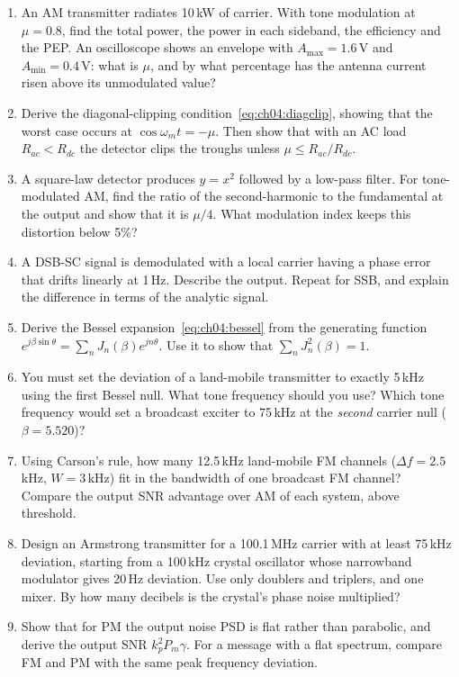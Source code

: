 \problems
\begin{enumerate}[label=\thechapter.\arabic*]
\item An AM transmitter radiates 10\,kW of carrier. With tone modulation at $\mu=0.8$, find the total power, the
power in each sideband, the efficiency and the PEP. An oscilloscope shows an envelope with $A_{\max}=1.6$\,V and
$A_{\min}=0.4$\,V: what is $\mu$, and by what percentage has the antenna current risen above its unmodulated
value?
\item Derive the diagonal-clipping condition~\eqref{eq:ch04:diagclip}, showing that the worst case occurs at
$\cos\omega_mt=-\mu$. Then show that with an AC load $R_{ac}<R_{dc}$ the detector clips the troughs unless
$\mu\le R_{ac}/R_{dc}$.
\item A square-law detector produces $y=x^2$ followed by a low-pass filter. For tone-modulated AM, find the
ratio of the second-harmonic to the fundamental at the output and show that it is $\mu/4$. What modulation index
keeps this distortion below 5\%?
\item A DSB-SC signal is demodulated with a local carrier having a phase error that drifts linearly at 1\,Hz.
Describe the output. Repeat for SSB, and explain the difference in terms of the analytic signal.
\item Derive the Bessel expansion~\eqref{eq:ch04:bessel} from the generating function
$e^{j\beta\sin\theta}=\sum_n J_n(\beta)e^{jn\theta}$. Use it to show that $\sum_nJ_n^2(\beta)=1$.
\item You must set the deviation of a land-mobile transmitter to exactly 5\,kHz using the first Bessel null.
What tone frequency should you use? Which tone frequency would set a broadcast exciter to 75\,kHz at the
\emph{second} carrier null ($\beta=5.520$)?
\item Using Carson's rule, how many 12.5\,kHz land-mobile FM channels ($\Delta f=2.5$\,kHz, $W=3$\,kHz) fit in the
bandwidth of one broadcast FM channel? Compare the output SNR advantage over AM of each system, above
threshold.
\item Design an Armstrong transmitter for a 100.1\,MHz carrier with at least 75\,kHz deviation, starting from a
100\,kHz crystal oscillator whose narrowband modulator gives 20\,Hz deviation. Use only doublers and triplers,
and one mixer. By how many decibels is the crystal's phase noise multiplied?
\item Show that for PM the output noise PSD is flat rather than parabolic, and derive the output SNR
$k_p^2P_m\gamma$. For a message with a flat spectrum, compare FM and PM with the same peak frequency deviation.

\end{enumerate}
